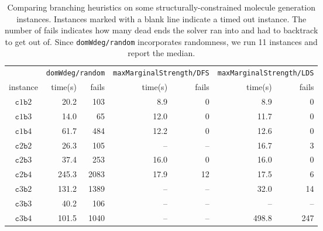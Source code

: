 \documentclass[../Document.tex]{subfiles}
\begin{document}
\begin{table}[t]
    \centering
    \begin{tabular}{crrrrrr}
        \hline
        & \multicolumn{2}{c}{\texttt{domWdeg/random}} &  \multicolumn{2}{c}{\texttt{maxMarginalStrength/DFS}} & \multicolumn{2}{c}{\texttt{maxMarginalStrength/LDS}}\\
        instance & time(s) & fails & time(s) & fails & time(s) & fails \\
        \hline
        $\mathtt{c}1\mathtt{b}2$ & 20.2 & 103 &  8.9 & 0 & 8.9 & 0\\
        $\mathtt{c}1\mathtt{b}3$ & 14.0 & 65 &  12.0 & 0 & 11.7 & 0\\
        $\mathtt{c}1\mathtt{b}4$ & 61.7 & 484 & 12.2 & 0 & 12.6 & 0\\
        $\mathtt{c}2\mathtt{b}2$ & 26.3 & 105 &  -- & -- & 16.7 & 3\\
        $\mathtt{c}2\mathtt{b}3$ & 37.4 & 253 & 16.0 & 0 & 16.0 & 0\\
        $\mathtt{c}2\mathtt{b}4$ & 245.3 & 2083 &  17.9 & 12 & 17.5 & 6\\
        $\mathtt{c}3\mathtt{b}2$ & 131.2 & 1389 & -- & -- & 32.0 & 14\\
        $\mathtt{c}3\mathtt{b}3$ & 40.2 & 106 &  -- & -- & -- & --\\
        $\mathtt{c}3\mathtt{b}4$ & 101.5 & 1040 &  -- & -- & 498.8 & 247\\
        \hline
    \end{tabular}
    \caption[Comparing branching heuristics on some structurally-constrained molecule generation instances.]{Comparing branching heuristics on some structurally-constrained molecule generation instances. Instances marked with a blank line indicate a timed out instance. The number of fails indicates how many dead ends the solver ran into and had to backtrack to get out of. Since \texttt{domWdeg/random} incorporates randomness, we run 11 instances and report the median.}
    \label{tab:structural-results}
\end{table}
\end{document}
